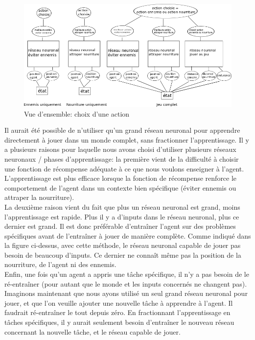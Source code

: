 \documentclass[11pt,a4paper]{report}
\begin{document}
   \begin{figure}[!h]
   \center
   \includegraphics[scale=0.6]{ressources/vue_ensemble_reseaux_agents.png}
   \caption{Vue d'ensemble: choix d'une action}
   \end{figure} 
  
  \par Il aurait été possible de n'utiliser qu'un grand réseau neuronal pour apprendre directement à jouer dans un monde complet, sans fractionner l'apprentissage. Il y a plusieurs raisons pour laquelle nous avons choisi d'utiliser plusieurs réseaux neuronaux / phases d'apprentissage: la première vient de la difficulté à choisir une fonction de récompense adéquate à ce que nous voulons enseigner à l'agent. L'apprentissage est plus efficace lorsque la fonction de récompense renforce le comportement de l'agent dans un contexte bien spécifique (éviter ennemis ou attraper la nourriture). \\
  La deuxième raison vient du fait que plus un réseau neuronal est grand, moins l'apprentissage est rapide. Plus il y a d'inputs dans le réseau neuronal, plus ce dernier est grand. Il est donc préférable d’entraîner l'agent sur des problèmes spécifiques avant de l’entraîner à jouer de manière complète. Comme indiqué dans la figure ci-dessus, avec cette méthode, le réseau neuronal capable de jouer pas besoin de beaucoup d'inputs. Ce dernier ne connaît même pas la position de la nourriture, de l'agent ni des ennemis. \\
  Enfin, une fois qu'un agent a appris une tâche spécifique, il n'y a pas besoin de le ré-entraîner  (pour autant que le monde et les inputs concernés ne changent pas). Imaginons maintenant que nous ayons utilisé un seul grand réseau neuronal pour jouer, et que l'on veuille ajouter une nouvelle tâche à apprendre à l'agent. Il faudrait ré-entraîner le tout depuis zéro. En fractionnant l'apprentissage en tâches spécifiques, il y aurait seulement besoin d’entraîner le nouveau réseau concernant la nouvelle tâche, et le réseau capable de jouer.  
  
\end{document}
